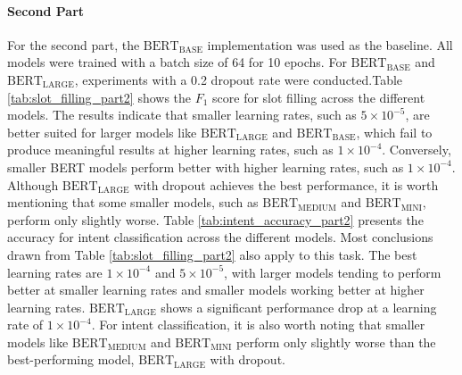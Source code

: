 \documentclass[a4paper]{article}
\begin{document}
\paragraph*{Second Part}
For the second part, the $\text{BERT}_{\text{BASE}}$ implementation was used as the baseline. All models were trained with a batch size of 64 for 10 epochs. For $\text{BERT}_{\text{BASE}}$ and $\text{BERT}_{\text{LARGE}}$, experiments with a 0.2 dropout rate were conducted.Table \ref{tab:slot_filling_part2} shows the $F_1$ score for slot filling across the different models. The results indicate that smaller learning rates, such as $5 \times 10^{-5}$, are better suited for larger models like $\text{BERT}_{\text{LARGE}}$ and $\text{BERT}_{\text{BASE}}$, which fail to produce meaningful results at higher learning rates, such as $1 \times 10^{-4}$. Conversely, smaller BERT models perform better with higher learning rates, such as $1 \times 10^{-4}$. Although $\text{BERT}_{\text{LARGE}}$ with dropout achieves the best performance, it is worth mentioning that some smaller models, such as $\text{BERT}_{\text{MEDIUM}}$ and $\text{BERT}_{\text{MINI}}$, perform only slightly worse. Table \ref{tab:intent_accuracy_part2} presents the accuracy for intent classification across the different models. Most conclusions drawn from Table \ref{tab:slot_filling_part2} also apply to this task. The best learning rates are $1 \times 10^{-4}$ and $5 \times 10^{-5}$, with larger models tending to perform better at smaller learning rates and smaller models working better at higher learning rates. $\text{BERT}_{\text{LARGE}}$ shows a significant performance drop at a learning rate of $1 \times 10^{-4}$. For intent classification, it is also worth noting that smaller models like $\text{BERT}_{\text{MEDIUM}}$ and $\text{BERT}_{\text{MINI}}$ perform only slightly worse than the best-performing model, $\text{BERT}_{\text{LARGE}}$ with dropout.
\end{document}
